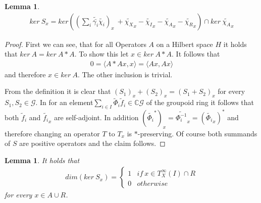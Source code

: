 \documentclass[12pt,a4paper]{scrartcl}
\newtheorem{Lemma}[Theorem]{Lemma}
\numberwithin{equation}{section}
\newcommand{\C}{\mathbb{C}} %
\newcommand{\2}{\mathbb{Z} / 2 \mathbb{Z}}
\newcommand{\G}{\mathcal{G}}
\newcommand{\1}{\bar{1}}
\newcommand{\0}{\bar{0}}
\begin{document}
\begin{Lemma}
	\begin{align*}
	ker \ S_x = ker((\sum_{i} \tilde{\bar{\gamma_i}} \tilde{\chi_i})_x \ + \tilde{\chi_X}_x - \tilde{\chi_I}_x - \tilde{\chi_A}_x - \tilde{\chi_R}_x) \cap ker \ \tilde{\chi_A}_x
	\end{align*}
\end{Lemma}
\begin{proof}
	First we can see, that for all Operators $A$ on a Hilbert space $H$ it holds that $ker \ A = ker \ A*A$. To show this let $x \in ker \ A*A$. It follows that
	\begin{align*}
		0 = \langle A*Ax, x \rangle = \langle Ax, Ax \rangle
	\end{align*}
	and therefore $x \in ker \ A$. The other inclusion is trivial. 
	
	From the definition it is clear that $(S_1)_x + (S_2)_x = (S_1 + S_2)_x$ for every $S_1, S_2 \in \G$. In for an element$\sum_{i \in I} \tilde \Phi_i\tilde f_i \in \C\G$ of the  groupoid ring it follows that both $\tilde f_i$ and $\tilde {f_i}_x$ are self-adjoint. In addition $(\widetilde {\Phi_i}^*)_x = \widetilde {\Phi_i^{-1}}_x = (\widetilde {\Phi_i}_x)^*$  and therefore changing an operator $T$ to $T_x$ is $*$-preserving. Of course both summands of $S$ are positive operators and the claim follows.
\end{proof}
\begin{Lemma}
	It holds that
	\begin{align*}
		dim (ker \ S_x) = \begin{cases}
		1 & if \ x \in T_X^\infty(I) \cap R\\
		0 & otherwise 
		\end{cases}
	\end{align*}
	for every $x \in A \cup R$.
\end{Lemma}
\end{document}
